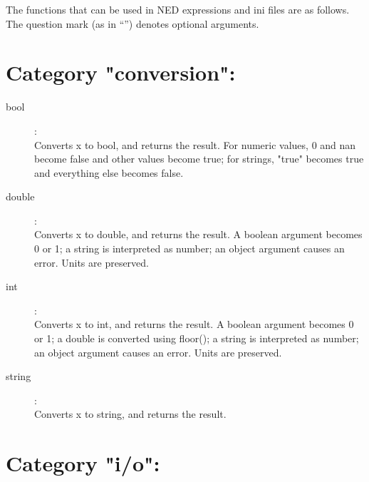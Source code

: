 \label{cha:ned-functions}

The functions that can be used in NED expressions and ini files are as follows.
The question mark (as in ``'') denotes optional arguments.

%
%

\section{Category "conversion":}
\label{sec:ned-functions:category-conversion}

\begin{description}
\item[bool]:  \\
    Converts x to bool, and returns the result. For numeric values, 0 and nan
    become false and other values become true; for strings, "true" becomes true
    and everything else becomes false.

\item[double]:  \\
    Converts x to double, and returns the result. A boolean argument becomes 0
    or 1; a string is interpreted as number; an object argument causes an
    error. Units are preserved.

\item[int]:  \\
    Converts x to int, and returns the result. A boolean argument becomes 0 or
    1; a double is converted using floor(); a string is interpreted as number;
    an object argument causes an error. Units are preserved.

\item[string]:  \\
    Converts x to string, and returns the result.


\end{description}

\section{Category "i/o":}
\label{sec:ned-functions:category-io}

